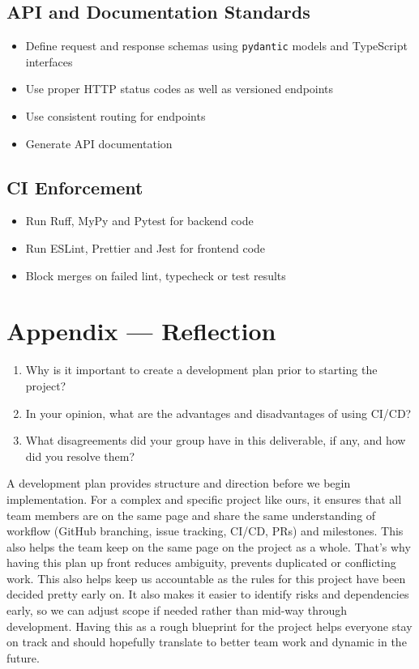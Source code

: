 \documentclass{article}
\begin{document}
\subsection*{API and Documentation Standards}
\begin{itemize}
    \item Define request and response schemas using \texttt{pydantic} models and TypeScript interfaces
    \item Use proper HTTP status codes as well as versioned endpoints
    \item Use consistent routing for endpoints
    \item Generate API documentation
\end{itemize}

\subsection*{CI Enforcement}
\begin{itemize}
    \item Run Ruff, MyPy and Pytest for backend code
    \item Run ESLint, Prettier and Jest for frontend code
    \item Block merges on failed lint, typecheck or test results
\end{itemize}

\newpage{}

\section*{Appendix --- Reflection}




\begin{enumerate}
    \item Why is it important to create a development plan prior to starting the
    project?
    \item In your opinion, what are the advantages and disadvantages of using
    CI/CD?
    \item What disagreements did your group have in this deliverable, if any,
    and how did you resolve them?
\end{enumerate}


\hspace{2em} A development plan provides structure and direction before we begin implementation. For a complex and specific project like ours, it ensures that all team members are on the same page and share the same understanding of workflow (GitHub branching, issue tracking, CI/CD, PRs) and milestones. This also helps the team keep on the same page on the project as a whole. That’s why having this plan up front reduces ambiguity, prevents duplicated or conflicting work. This also helps keep us accountable as the rules for this project have been decided pretty early on. It also makes it easier to identify risks and dependencies early, so we can adjust scope if needed rather than mid-way through development. Having this as a rough blueprint for the project helps everyone stay on track and should hopefully translate to better team work and dynamic in the future.
\end{document}
